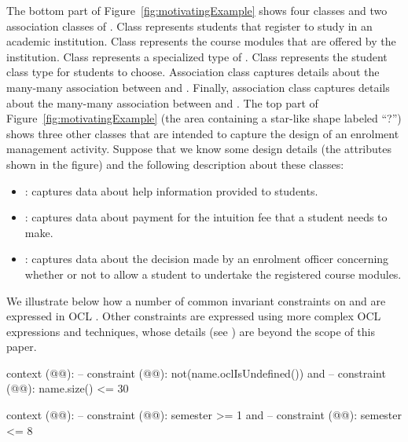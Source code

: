 The bottom part of Figure~\ref{fig:motivatingExample} shows four classes and two association classes of . Class  represents students that register to study in an academic institution. Class  represents the course modules that are offered by the institution. Class  represents a specialized type of . Class  represents the student class type for students to choose. Association class  captures details about the many-many association between  and . Finally, association class  captures details about the many-many association between  and .
The top part of Figure~\ref{fig:motivatingExample} (the area containing a star-like shape labeled ``?'') shows three other classes that are intended to capture the design of an enrolment management activity. Suppose that we know some design details (the attributes shown in the figure) and the following description about these classes:
%
\begin{itemize}[noitemsep]
  \item {}: captures data about help information provided to students.
  \item {}: captures data about payment for the intuition fee that a student needs to make.
  \item {}: captures data about the decision made by an enrolment officer concerning whether or not to allow a student to undertake the registered course modules.
\end{itemize}

We illustrate below how a number of common invariant constraints on  and  are expressed in OCL \cite{omg_object_2014}. Other constraints are expressed using more complex OCL expressions and techniques, whose details (see \cite{le_domain_2018}) are beyond the scope of this paper.

%
\begin{lstrulex}
context (@@):
  -- constraint (@@):
  not(name.oclIsUndefined()) and 
  -- constraint (@@):
  name.size() <= 30

context (@@):
  -- constraint (@@):
  semester >= 1 and 
  -- constraint (@@):
  semester <= 8
\end{lstrulex}

